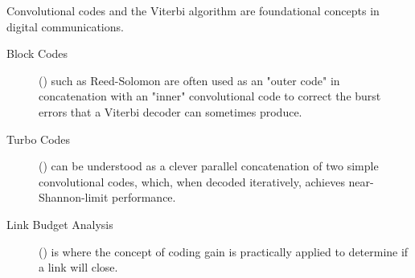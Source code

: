 \begin{importantbox}[title={Further Reading}]
    Convolutional codes and the Viterbi algorithm are foundational concepts in digital communications.
    \begin{description}
        \item[Block Codes] () such as Reed-Solomon are often used as an "outer code" in concatenation with an "inner" convolutional code to correct the burst errors that a Viterbi decoder can sometimes produce.
        \item[Turbo Codes] () can be understood as a clever parallel concatenation of two simple convolutional codes, which, when decoded iteratively, achieves near-Shannon-limit performance.
        \item[Link Budget Analysis] () is where the concept of coding gain is practically applied to determine if a link will close.
    \end{description}
\end{importantbox}
